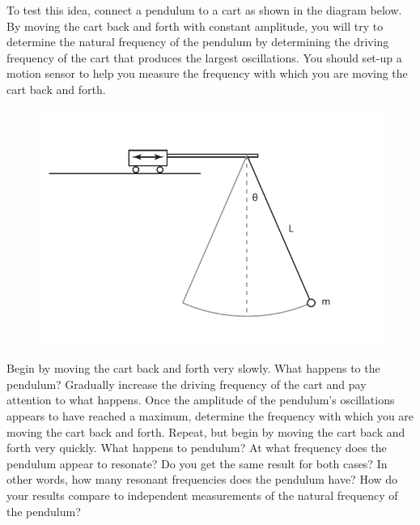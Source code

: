 \documentclass[11pt,letterpaper]{article}
\begin{document}
To test this idea, connect a pendulum to a cart as shown in the diagram below. By moving the cart back and forth with constant amplitude, you will try to determine the natural frequency of the pendulum by determining the driving frequency of the cart that produces the largest oscillations. You should set-up a motion sensor to help you measure the frequency with which you are moving the cart back and forth.

\begin{figure}[h]
\begin{center}
\includegraphics[]{./pendulum_resonance}
\end{center}
\end{figure}

Begin by moving the cart back and forth very slowly. What happens to the pendulum? Gradually increase the driving frequency of the cart and pay attention to what happens. Once the amplitude of the pendulum's oscillations appears to have reached a maximum, determine the frequency with which you are moving the cart back and forth. Repeat, but begin by moving the cart back and forth very quickly. What happens to pendulum? At what frequency does the pendulum appear to resonate? Do you get the same result for both cases? In other words, how many resonant frequencies does the pendulum have? How do your results compare to independent measurements of the natural frequency of the pendulum?
\end{document}
